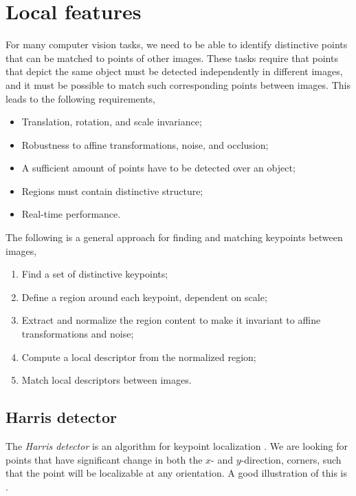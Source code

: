 \section{Local features}

For many computer vision tasks, we need to be able to identify distinctive
points that can be matched to points of other images.
These tasks require that points that depict the same object must be detected
independently in different images, and it must be possible to match such
corresponding points between images. This leads to the following requirements,
\begin{itemize}
  \item Translation, rotation, and scale invariance;
  \item Robustness to affine transformations, noise, and occlusion;
  \item A sufficient amount of points have to be detected over an object;
  \item Regions must contain distinctive structure;
  \item Real-time performance.
\end{itemize}

The following is a general approach for finding and matching keypoints between
images,
\begin{enumerate}
  \item Find a set of distinctive keypoints;
  \item Define a region around each keypoint, dependent on scale;
  \item Extract and normalize the region content to make it invariant to
    affine transformations and noise;
  \item Compute a local descriptor from the normalized region;
  \item Match local descriptors between images.
\end{enumerate}

\subsection{Harris detector}

The \textit{Harris detector} is an algorithm for keypoint localization
\citep{harris1988combined}. We are looking for points that have significant
change in both the $x$- and $y$-direction, \ie corners, such that the point
will be localizable at any orientation. A good illustration of this is
.

